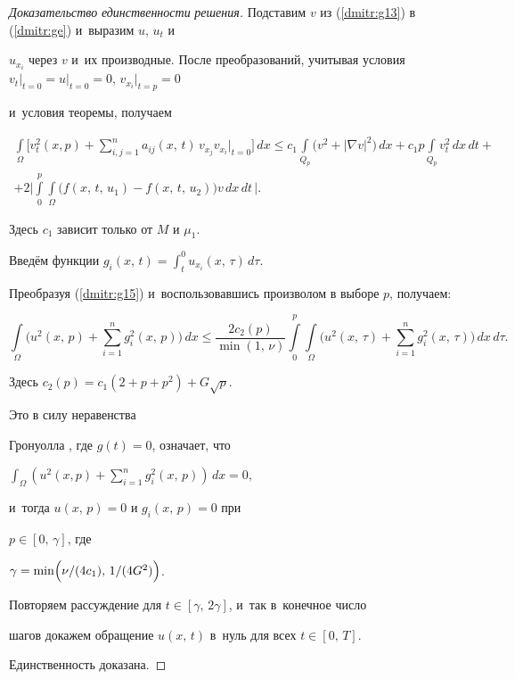 \begin{proof}[Доказательство\,\,единственности\,\,решения]
Подставим $v$ из (\ref{dmitr:g13}) в (\ref{dmitr:ge}) и~выразим $u$, $u_{t}$ и


$u_{x_{i}}$ через $v$ и~их производные. После преобразований, учитывая условия $v_t\Big|_{t=0}=u\Big|_{t=0}=0$, $v_{x_{i}}\Big|_{t=p}=0$


и~условия теоремы,  получаем


\begin{multline}


 \int\limits_{\Omega}\biggl[v_{t}^2(x,p)+ \sum\limits_{i,j=1}^n


a_{ij}(x,\, t)\,v_{x_j}v_{x_i} \Big|_{t=0}\biggr]\,dx\le c_1\int\limits_{Q_p} \bigl(v^2+|\nabla


v|^2\bigr)\,dx+c_1p\int\limits_{Q_p}v_t^2\,dx\,dt+


\\


\label{dmitr:g15}


+2\biggl|\int\limits_{0}^p\int\limits_{\Omega}\bigl(f(x,\,t,\,u_1)-f(x,\,t,\,u_2)\bigr)v\,dx\,dt\,\biggr|.


\end{multline}


Здесь $c_1$ зависит только от $M$ и $\mu_1$.





Введём функции $g_i(x,\, t)=\displaystyle \int_t^0u_{x_{i}}


(x,\,\tau)\,d\tau$.


Преобразуя (\ref{dmitr:g15}) и~воспользовавшись произволом в выборе $p$, получаем:


$$ \int\limits_{\Omega}\biggl(u^2(x,\,p)+\sum\limits_{i=1}^n


g_i^2(x,\,p)\biggr)\,dx\le\frac{2c_2(p)}{\min(1,\,\nu)}\int\limits_0^{p}


\int\limits_{\Omega}\biggl(u^2(x,\,\tau)+\sum\limits_{i=1}^n


g_i^2(x,\,\tau)\biggr)\,dx\,d\tau.$$


Здесь $c_2(p)=c_1(2+p+p^2)+G\sqrt{p}.$


Это в силу неравенства


Гронуолла \cite[с.~23]{dm:7}, где $g(t)=0$, означает, что


${\displaystyle\int_{\Omega}}\left(u^2(x,p)+\sum\limits_{i=1}^n


g_i^2(x,\, p)\right)\,dx=0,$


и~тогда \mbox{$u(x,\, p)=0$} и $g_i(x,\,p)=0$ при


$p\in[0,\,\gamma]$, где


$\gamma=\min\Bigl(\nu/(4c_1),\, 1/(4G^2)\Bigr)$.


Повторяем рассуждение для $t\in[\gamma,\, 2\gamma]$, и~так в~конечное число


шагов докажем обращение $u(x,\, t)$ в~нуль для всех $t\in[0,\,T]$.


Единственность доказана.


\end{proof}





